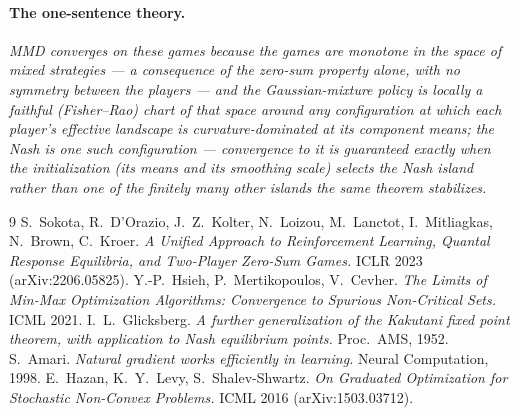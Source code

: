 \documentclass[11pt]{article}
\theoremstyle{definition}
\begin{document}
\paragraph{The one-sentence theory.} \emph{MMD converges on these games because
the games are monotone in the space of mixed strategies --- a consequence of the
zero-sum property alone, with no symmetry between the players --- and the
Gaussian-mixture policy is locally a faithful (Fisher--Rao) chart of that
space around any configuration at which each player's effective landscape is
curvature-dominated at its component means; the Nash is one such
configuration --- convergence to it is guaranteed exactly when the
initialization (its means \emph{and} its smoothing scale) selects the Nash
island rather than one of the finitely many other islands the same theorem
stabilizes.}

\begin{thebibliography}{9}
 S.~Sokota, R.~D'Orazio, J.~Z.~Kolter, N.~Loizou,
M.~Lanctot, I.~Mitliagkas, N.~Brown, C.~Kroer.
\emph{A Unified Approach to Reinforcement Learning, Quantal Response
Equilibria, and Two-Player Zero-Sum Games.} ICLR 2023 (arXiv:2206.05825).
 Y.-P.~Hsieh, P.~Mertikopoulos, V.~Cevher.
\emph{The Limits of Min-Max Optimization Algorithms: Convergence to Spurious
Non-Critical Sets.} ICML 2021.
 I.~L.~Glicksberg. \emph{A further generalization of
the Kakutani fixed point theorem, with application to Nash equilibrium
points.} Proc.\ AMS, 1952.
 S.~Amari. \emph{Natural gradient works efficiently in
learning.} Neural Computation, 1998.
 E.~Hazan, K.~Y.~Levy, S.~Shalev-Shwartz. \emph{On
Graduated Optimization for Stochastic Non-Convex Problems.} ICML 2016
(arXiv:1503.03712).
\end{thebibliography}
\end{document}
